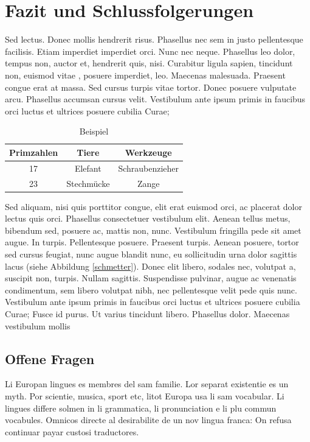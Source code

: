 \documentclass[paper=a4,fontsize=12pt,ngerman]{scrartcl}
\begin{document}
\section{Fazit und Schlussfolgerungen}
Sed lectus. Donec mollis hendrerit risus. Phasellus nec sem in justo 
pellentesque facilisis. Etiam imperdiet imperdiet orci. Nunc nec neque. 
Phasellus leo dolor, tempus non, auctor et, hendrerit quis, nisi. Curabitur 
ligula sapien, tincidunt non, euismod vitae \cite{arrow48}, posuere 
imperdiet, leo. Maecenas malesuada. Praesent congue erat at massa. Sed cursus 
turpis vitae tortor. Donec posuere vulputate arcu. Phasellus accumsan cursus 
velit. Vestibulum ante ipsum primis in faucibus orci luctus et ultrices 
posuere cubilia Curae; 
\begin{table}[h]
\begin{center}
  \begin{tabular}{ |c|c|c| } 
    \hline
    Primzahlen & Tiere & Werkzeuge \\ 
    \hline
    17 & Elefant    & Schraubenzieher \\ 
    23 & Stechmücke & Zange \\ 
    \hline
  \end{tabular}
    \caption{Beispiel}
\end{center}
\end{table}
Sed aliquam, nisi quis porttitor congue, elit erat euismod orci, ac placerat 
dolor lectus quis orci. Phasellus consectetuer vestibulum elit. Aenean tellus 
metus, bibendum sed, posuere ac, mattis non, nunc. Vestibulum fringilla pede 
sit amet augue. In turpis. Pellentesque posuere. Praesent turpis. Aenean 
posuere, tortor sed cursus feugiat, nunc augue blandit nunc, eu sollicitudin 
urna dolor sagittis lacus (siehe Abbildung \ref{schmetter}). Donec elit 
libero, sodales nec, volutpat a, suscipit non, turpis. Nullam sagittis. 
Suspendisse pulvinar, augue ac venenatis condimentum, sem libero volutpat 
nibh, nec pellentesque velit pede quis nunc. Vestibulum ante ipsum primis in 
faucibus orci luctus et ultrices posuere cubilia Curae; Fusce id purus. Ut 
varius tincidunt libero. Phasellus dolor. Maecenas vestibulum mollis

\subsection{Offene Fragen}
Li Europan lingues es membres del sam familie. Lor separat existentie es un 
myth. Por scientie, musica, sport etc, litot Europa usa li sam vocabular. Li 
lingues differe solmen in li grammatica, li pronunciation e li plu commun 
vocabules. Omnicos directe al desirabilite de un nov lingua franca: On refusa 
continuar payar custosi traductores.
\end{document}
